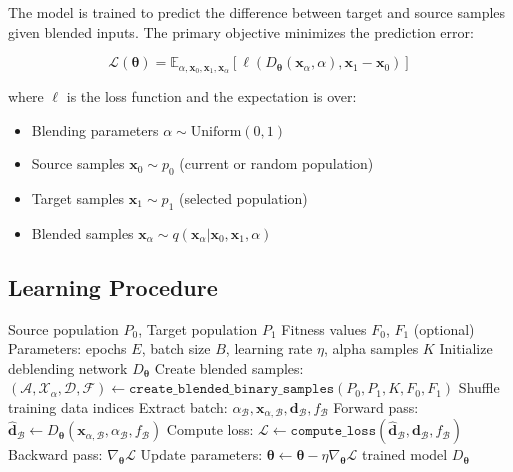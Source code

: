 \documentclass[11pt,a4paper]{article}
\newcommand{\E}{\mathbb{E}}
\newcommand{\vx}{\mathbf{x}}
\newcommand{\vtheta}{\boldsymbol{\theta}}
\begin{document}
The model is trained to predict the difference between target and source samples given blended inputs. The primary objective minimizes the prediction error:

\begin{equation}
    \mathcal{L}(\vtheta) = \E_{\alpha, \vx_0, \vx_1, \vx_\alpha}\left[\ell\left(D_\vtheta(\vx_\alpha, \alpha), \vx_1 - \vx_0\right)\right]
\end{equation}

where $\ell$ is the loss function and the expectation is over:
\begin{itemize}
    \item Blending parameters $\alpha \sim \text{Uniform}(0, 1)$
    \item Source samples $\vx_0 \sim p_0$ (current or random population)
    \item Target samples $\vx_1 \sim p_1$ (selected population)
    \item Blended samples $\vx_\alpha \sim q(\vx_\alpha | \vx_0, \vx_1, \alpha)$
\end{itemize}

\subsection{Learning Procedure}

\begin{algorithm}[H]
\caption{Learning Binary DbD Model}
\label{alg:learning}
\begin{algorithmic}[1]
\Require Source population $P_0$, Target population $P_1$
\Require Fitness values $F_0$, $F_1$ (optional)
\Require Parameters: epochs $E$, batch size $B$, learning rate $\eta$, alpha samples $K$
\State Initialize deblending network $D_\vtheta$
\State Create blended samples: $(\mathcal{A}, \mathcal{X}_\alpha, \mathcal{D}, \mathcal{F}) \gets \texttt{create\_blended\_binary\_samples}(P_0, P_1, K, F_0, F_1)$
    \State Shuffle training data indices
        \State Extract batch: $\alpha_\mathcal{B}, \vx_{\alpha,\mathcal{B}}, \mathbf{d}_\mathcal{B}, f_\mathcal{B}$
        \State Forward pass: $\hat{\mathbf{d}}_\mathcal{B} \gets D_\vtheta(\vx_{\alpha,\mathcal{B}}, \alpha_\mathcal{B}, f_\mathcal{B})$
        \State Compute loss: $\mathcal{L} \gets \texttt{compute\_loss}(\hat{\mathbf{d}}_\mathcal{B}, \mathbf{d}_\mathcal{B}, f_\mathcal{B})$
        \State Backward pass: $\nabla_\vtheta \mathcal{L}$
        \State Update parameters: $\vtheta \gets \vtheta - \eta \nabla_\vtheta \mathcal{L}$
    \EndFor
\EndFor
\State \Return trained model $D_\vtheta$
\end{algorithmic}
\end{algorithm}
\end{document}
